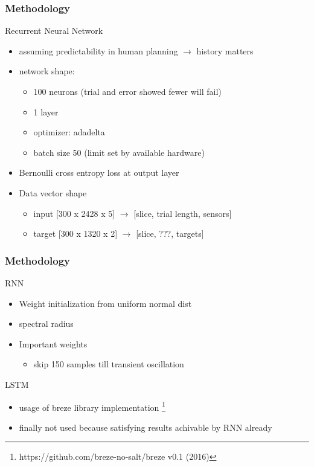 \documentclass{beamer}
\begin{document}
\begin{frame}
\frametitle{Methodology}
Recurrent Neural Network
\begin{itemize}
    \item assuming predictability in human planning $\rightarrow$ history matters
    \item network shape:
    \begin{itemize}
        \item 100 neurons (trial and error showed fewer will fail)
        \item 1 layer
        \item optimizer: adadelta
        \item batch size 50 (limit set by available hardware)
    \end{itemize}
    \item Bernoulli cross entropy loss at output layer
    \item Data vector shape
    \begin{itemize}
        \item input  [300 x 2428 x 5] $\rightarrow$ [slice, trial length, sensors]
        \item target [300 x 1320 x 2] $\rightarrow$ [slice, ???, targets]
    \end{itemize}
\end{itemize}
\end{frame}

\begin{frame}
\frametitle{Methodology}
RNN
\begin{itemize}
    \item Weight initialization from uniform normal dist
    \item spectral radius
    \item Important weights
    \begin{itemize}
        \item skip 150 samples till transient oscillation
    \end{itemize}
\end{itemize}

LSTM
\begin{itemize}
    \item usage of breze library implementation \footnote{https://github.com/breze-no-salt/breze v0.1 (2016)} 
    \item finally not used because satisfying results achivable by RNN already
\end{itemize}

\end{frame}
\end{document}
